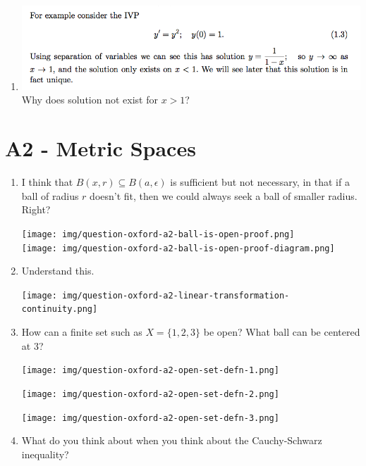 \documentclass[12pt]{article}
\begin{document}
\begin{enumerate}
\item \includegraphics[width=400pt]{img/question-differential-equations-a1-warning.png}\\
  Why does solution not exist for $x > 1$?
\end{enumerate}

\section{A2 - Metric Spaces}


\begin{enumerate}
\item I think that $B(x, r) \subseteq B(a, \epsilon)$ is sufficient but not necessary, in that if a
  ball of radius $r$ doesn't fit, then we could always seek a ball of smaller radius. Right?
  \begin{mdframed}
    \texttt{[image: img/question-oxford-a2-ball-is-open-proof.png]}\\
    \texttt{[image: img/question-oxford-a2-ball-is-open-proof-diagram.png]}
  \end{mdframed}
\item Understand this.
  \begin{mdframed}
    \texttt{[image: img/question-oxford-a2-linear-transformation-continuity.png]}
  \end{mdframed}
\newpage
\item How can a finite set such as $X = \{1, 2, 3\}$ be open? What ball can be centered at 3?
  \begin{mdframed}
    \texttt{[image: img/question-oxford-a2-open-set-defn-1.png]}
  \end{mdframed}
  \begin{mdframed}
    \texttt{[image: img/question-oxford-a2-open-set-defn-2.png]}
  \end{mdframed}
  \begin{mdframed}
    \texttt{[image: img/question-oxford-a2-open-set-defn-3.png]}
  \end{mdframed}
\item What do you think about when you think about the Cauchy-Schwarz inequality?
\end{enumerate}
\end{document}
